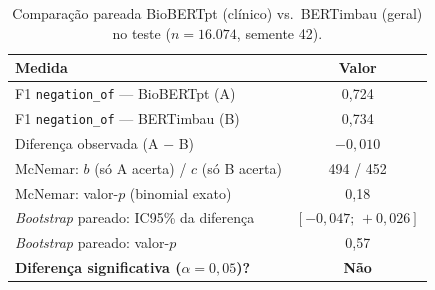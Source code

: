 \begin{table}[ht]
\centering
\caption{Comparação pareada BioBERTpt (clínico) vs.\ BERTimbau (geral) no teste
($n=16.074$, semente 42).}
\label{tab:signif}
\begin{tabular}{lc}
\toprule
\textbf{Medida} & \textbf{Valor} \\
\midrule
F1 \texttt{negation\_of} --- BioBERTpt (A) & 0,724 \\
F1 \texttt{negation\_of} --- BERTimbau (B) & 0,734 \\
Diferença observada (A $-$ B) & $-0,010$ \\
McNemar: $b$ (só A acerta) / $c$ (só B acerta) & 494 / 452 \\
McNemar: valor-$p$ (binomial exato) & 0,18 \\
\emph{Bootstrap} pareado: IC95\% da diferença & $[-0,047;\,+0,026]$ \\
\emph{Bootstrap} pareado: valor-$p$ & 0,57 \\
\textbf{Diferença significativa ($\alpha=0,05$)?} & \textbf{Não} \\
\bottomrule
\end{tabular}
\end{table}
